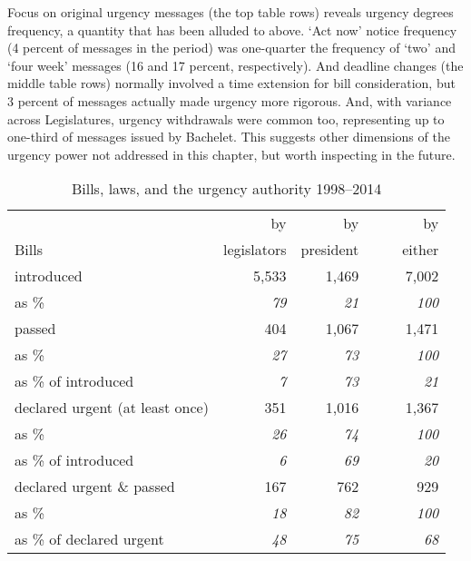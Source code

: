 \documentclass[letter,12pt]{article}
\begin{document}
Focus on original urgency messages (the top table rows) reveals urgency degrees frequency, a quantity that has been alluded to above. `Act now' notice frequency (4 percent of messages in the period) was one-quarter the frequency of `two' and `four week' messages (16 and 17 percent, respectively). And deadline changes (the middle table rows) normally involved a time extension for bill consideration, but 3 percent of messages actually made urgency more rigorous. And, with variance across Legislatures, urgency withdrawals were common too, representing up to one-third of messages issued by Bachelet. This suggests other dimensions of the urgency power not addressed in this chapter, but worth inspecting in the future. 

\begin{table}
\centering
\begin{tabular}{lrrr}
                                &  by           &  by          &    by      \\
Bills                           &  legislators  &  president   &    ~~~~either  \\ \hline
introduced                      &        5,533  &       1,469  &     7,002  \\
as \%                           &    \emph{79}  &   \emph{21}  & \emph{100} \\ \hdashline
passed                          &          404  &       1,067  &     1,471  \\
as \%                           &    \emph{27}  &   \emph{73}  & \emph{100} \\
as \% of introduced             &     \emph{7}  &   \emph{73}  &  \emph{21} \\ \hdashline
declared urgent (at least once) &          351  &       1,016  &     1,367  \\
as \%                           &    \emph{26}  &   \emph{74}  & \emph{100} \\
as \% of introduced             &     \emph{6}  &   \emph{69}  &  \emph{20} \\ \hdashline
declared urgent \& passed       &          167  &         762  &       929  \\
as \%                           &    \emph{18}  &   \emph{82}  & \emph{100} \\
as \% of declared urgent        &    \emph{48}  &   \emph{75}  &  \emph{68} \\ \hline
\end{tabular}
\caption{Bills, laws, and the urgency authority 1998--2014}\label{T:billDescriptives}
\end{table}
\end{document}
